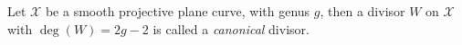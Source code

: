\begin{definition}
  Let $\mathcal{X}$ be a smooth projective plane curve, with genus $g$, then a divisor $W$ on $\mathcal{X}$ with $\deg(W) = 2g - 2$ is called a \textit{canonical} divisor.
\end{definition}
%
%
%
